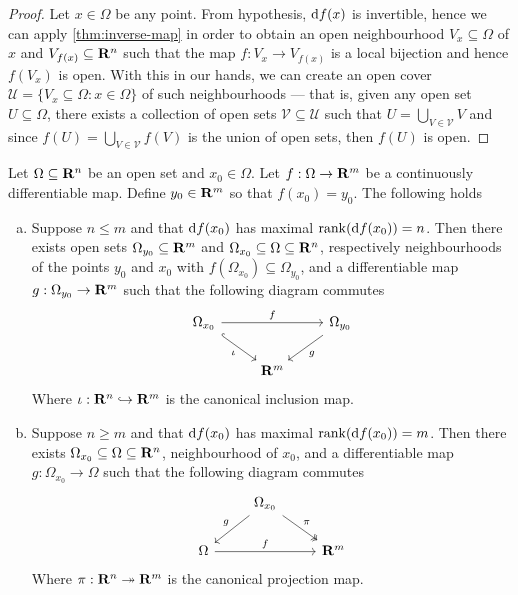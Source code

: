 \begin{proof}
    Let \(x \in \Omega\) be any point. From hypothesis, \(\mathrm{d} f(x)\) is invertible,
    hence we can apply \cref{thm:inverse-map} in order to obtain an open
    neighbourhood \(V_{x} \subseteq \Omega\) of \(x\) and \(V_{f(x)} \subseteq \mathbf{R}^n\) such that the map
    \(f: V_{x} \to V_{f(x)}\) is a local bijection and hence \(f(V_x)\) is
    open. With this in our hands, we can create an open cover \(\mathcal U =
    \{V_{x} \subseteq \Omega \colon x \in \Omega\}\) of such neighbourhoods --- that is, given any open set
    \(U \subseteq \Omega\), there exists a collection of open sets \(\mathcal V \subseteq \mathcal U\)
    such that \(U = \bigcup_{V \in \mathcal V} V\) and since \(f(U) = \bigcup_{V \in \mathcal V}
    f(V)\) is the union of open sets, then \(f(U)\) is open.
\end{proof}

\begin{theorem}
    \label{thm:maximal-rank-theorem}
    Let \(\Omega \subseteq \mathbf{R}^n\) be an open set and \(x_0 \in \Omega\). Let \(f: \Omega \to \mathbf{R}^m\) be a
    continuously differentiable map. Define \(y_0 \in \mathbf{R}^m\) so that \(f(x_0) =
    y_0\). The following holds
    \begin{enumerate}[(a).]\setlength\itemsep{0em}
        \item Suppose \(n \leq m\) and that \(\mathrm{d} f(x_0)\) has maximal
              \(\operatorname{rank}(\mathrm{d} f(x_{0})) = n\). Then there exists open sets \(\Omega_{y_0} \subseteq
              \mathbf{R}^m\) and \(\Omega_{x_0} \subseteq \Omega \subseteq \mathbf{R}^n\), respectively neighbourhoods of the points
              \(y_0\) and \(x_0\) with \(f(\Omega_{x_0}) \subseteq \Omega_{y_0}\), and a differentiable
              map \(g: \Omega_{y_0} \to \mathbf{R}^m\) such that the following diagram commutes
              \[
                  \begin{tikzcd}
                      \Omega_{x_{0}} \ar[rr, "f"] \ar[dr, hook, swap, "\iota"]
                      & &\Omega_{y_0} \ar[dl, "g"] \\
                      &\R^m &
                  \end{tikzcd}
              \]
              Where \(\iota: \mathbf{R}^n \hookrightarrow \mathbf{R}^m\) is the canonical inclusion map.
        \item Suppose \(n \geq m\) and that \(\mathrm{d} f(x_0)\) has maximal
              \(\operatorname{rank}(\mathrm{d} f(x_0)) = m\). Then there exists \(\Omega_{x_0} \subseteq \Omega \subseteq \mathbf{R}^n\),
              neighbourhood of \(x_0\), and a differentiable map \(g: \Omega_{x_{0}} \to \Omega\)
              such that the following diagram commutes
              \[
                  \begin{tikzcd}
                      &\Omega_{x_0} \ar[dr, two heads, "\pi"] \ar[ld, swap, "g"] & \\
                      \Omega \ar[rr, "f"] & &\R^m
                  \end{tikzcd}
              \]
              Where \(\pi: \mathbf{R}^n \twoheadrightarrow \mathbf{R}^m\) is the canonical projection map.
    \end{enumerate}
\end{theorem}

